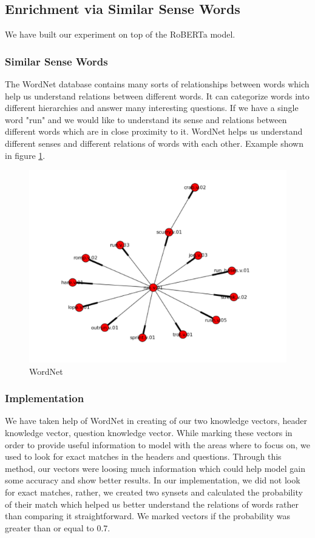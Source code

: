 \documentclass[12pt]{article}
\begin{document}
 
\subsection{Enrichment via Similar Sense Words}
We have built our experiment on top of the RoBERTa model. 

\subsubsection{Similar Sense Words}
The WordNet database contains many sorts of relationships between words which help us understand relations between different words. It can categorize words into different hierarchies and answer many interesting questions. If we have a single word "run" and we would like to understand its sense and relations between different words which are in close proximity to it. WordNet helps us understand different senses and different relations of words with each other. Example shown in figure \ref{wordnet}.


\begin{figure}[H]
    \includegraphics[width=400pt]{wordnet}
    \caption{WordNet}
    \label{wordnet}
\end{figure}

\subsubsection{Implementation}
We have taken help of WordNet in creating of our two knowledge vectors, header knowledge vector, question knowledge vector. While marking these vectors in order to provide useful information to model with the areas where to focus on, we used to look for exact matches in the headers and questions. Through this method, our vectors were loosing much information which could help model gain some accuracy and show better results. In our implementation, we did not look for exact matches, rather, we created two synsets and calculated the probability of their match which helped us better understand the relations of words rather than comparing it straightforward. We marked vectors if the probability was greater than or equal to 0.7. 
\end{document}
